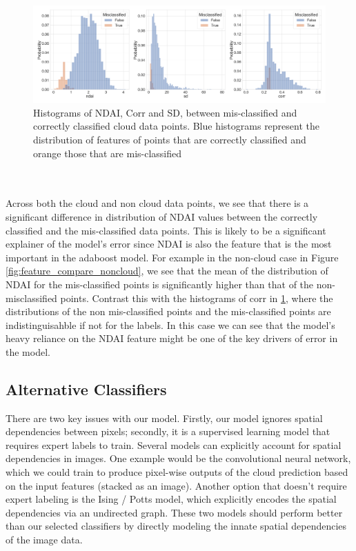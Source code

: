 \documentclass[11pt, letterpaper, journal]{IEEEtran}
\begin{document}
\begin{figure}[h]
\centering
\includegraphics[width=1.0\textwidth]{statics/feature_compare_true_pos_tr_23_te_1.png}
\caption{Histograms of NDAI, Corr and SD, between mis-classified and correctly classified cloud data points. Blue histograms represent the distribution of features of points that are correctly classified and orange those that are mis-classified}
\label{fig:feature_compare_cloud}
\end{figure}
\\
\\
Across both the cloud and non cloud data points, we see that there is a significant difference in distribution of NDAI values between the correctly classified and the mis-classified data points. This is likely to be a significant explainer of the model's error since NDAI is also the feature that is the most important in the adaboost model. For example in the non-cloud case in Figure \ref{fig:feature_compare_noncloud}, we see that the mean of the distribution of NDAI for the mis-classified points is significantly higher than that of the non-misclassified points. Contrast this with the histograms of corr in \ref{fig:feature_compare_cloud}, where the distributions of the non mis-classified points and the mis-classified points are indistinguisahble if not for the labels. In this case we can see that the model's heavy reliance on the NDAI feature might be one of the key drivers of error in the model.

\subsection{Alternative Classifiers}
There are two key issues with our model. Firstly, our model ignores spatial dependencies between pixels; secondly, it is a supervised learning model that requires expert labels to train. Several models can explicitly account for spatial dependencies in images. One example would be the convolutional neural network, which we could train to produce pixel-wise outputs of the cloud prediction based on the input features (stacked as an image). Another option that doesn't require expert labeling is the Ising / Potts model, which explicitly encodes the spatial dependencies via an undirected graph. These two models should perform better than our selected classifiers by directly modeling the innate spatial dependencies of the image data.
\end{document}
